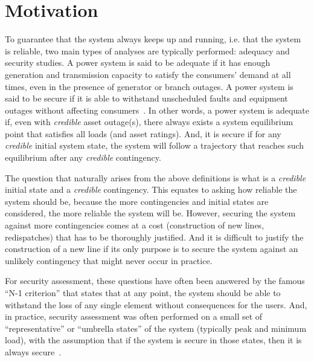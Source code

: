 \section{Motivation}

To guarantee that the system always keeps up and running, i.e. that the system is reliable,  two main types of analyses are typically performed: adequacy and security studies. A power system is said to be adequate if it has enough generation and transmission capacity to satisfy the consumers' demand at all times, even in the presence of generator or branch outages. A power system is said to be secure if it is able to withstand unscheduled faults and equipment outages without affecting consumers~\cite{AdequancySecurityDefinition}. In other words, a power system is adequate if, even with \emph{credible} asset outage(s), there always exists a system equilibrium point that satisfies all loads (and asset ratings). And, it is secure if for any \emph{credible} initial system state, the system will follow a trajectory that reaches such equilibrium after any \emph{credible} contingency.

The question that naturally arises from the above definitions is what is a \emph{credible} initial state and a \emph{credible} contingency. This equates to asking how reliable the system should be, because the more contingencies and initial states are considered, the more reliable the system will be. However, securing the system against more contingencies comes at a cost (construction of new lines, redispatches) that has to be thoroughly justified. And it is difficult to justify the construction of a new line if its only purpose is to secure the system against an unlikely contingency that might never occur in practice.

For security assessment, these questions have often been answered by the famous ``N-1 criterion'' that states that at any point, the system should be able to withstand the loss of any single element without consequences for the users. And, in practice, security assessment was often performed on a small set of ``representative'' or ``umbrella states'' of the system (typically peak and minimum load), with the assumption that if the system is secure in those states, then it is always secure~\cite{CIGREreviewOfTools}.

